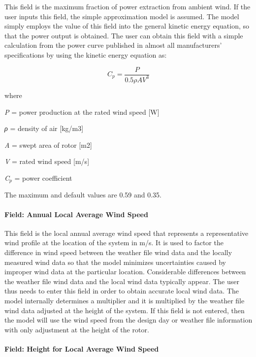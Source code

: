 This field is the maximum fraction of power extraction from ambient wind. If the user inputs this field, the simple approximation model is assumed. The model simply employs the value of this field into the general kinetic energy equation, so that the power output is obtained. The user can obtain this field with a simple calculation from the power curve published in almost all manufacturers' specifications by using the kinetic energy equation as:

\begin{equation}
{C_p} = \frac{P}{{0.5\rho A{V^3}}}
\end{equation}

where

\emph{P} = power production at the rated wind speed {[}W{]}

\emph{ρ} = density of air {[}kg/m3{]}

\emph{A} = swept area of rotor {[}m2{]}

\emph{V} = rated wind speed {[}m/s{]}

\emph{C\(_{p}\)} = power coefficient

The maximum and default values are 0.59 and 0.35.

\paragraph{Field: Annual Local Average Wind Speed}\label{field-annual-local-average-wind-speed}

This field is the local annual average wind speed that represents a representative wind profile at the location of the system in m/s. It is used to factor the difference in wind speed between the weather file wind data and the locally measured wind data so that the model minimizes uncertainties caused by improper wind data at the particular location. Considerable differences between the weather file wind data and the local wind data typically appear. The user thus needs to enter this field in order to obtain accurate local wind data. The model internally determines a multiplier and it is multiplied by the weather file wind data adjusted at the height of the system. If this field is not entered, then the model will use the wind speed from the design day or weather file information with only adjustment at the height of the rotor.

\paragraph{Field: Height for Local Average Wind Speed}\label{field-height-for-local-average-wind-speed}

